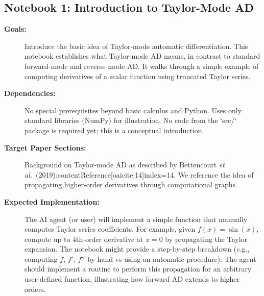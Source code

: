 \documentclass[11pt]{article}
\begin{document}
\subsection{Notebook 1: Introduction to Taylor-Mode AD}
\begin{description}
  \item[\textbf{Goals:}] Introduce the basic idea of Taylor-mode automatic differentiation. This notebook establishes what Taylor-mode AD means, in contrast to standard forward-mode and reverse-mode AD. It walks through a simple example of computing derivatives of a scalar function using truncated Taylor series.
  \item[\textbf{Dependencies:}] No special prerequisites beyond basic calculus and Python. Uses only standard libraries (NumPy) for illustration. No code from the `src/` package is required yet; this is a conceptual introduction.
  \item[\textbf{Target Paper Sections:}] Background on Taylor-mode AD as described by Bettencourt \textit{et al.}\ (2019):contentReference[oaicite:14]{index=14}. We reference the idea of propagating higher-order derivatives through computational graphs.
  \item[\textbf{Expected Implementation:}] The AI agent (or user) will implement a simple function that manually computes Taylor series coefficients. For example, given $f(x) = \sin(x)$, compute up to 4th-order derivative at $x=0$ by propagating the Taylor expansion. The notebook might provide a step-by-step breakdown (e.g., computing $f$, $f'$, $f''$ by hand vs using an automatic procedure). The agent should implement a routine to perform this propagation for an arbitrary user-defined function, illustrating how forward AD extends to higher orders.
\end{description}
\end{document}
